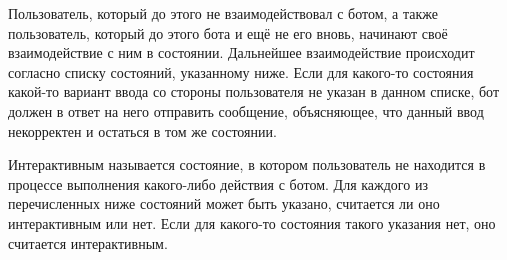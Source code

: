     Пользователь, который до этого не взаимодействовал с ботом, а также пользователь, который
    до этого  бота и ещё не  его вновь, начинают
    своё взаимодействие с ним в \hyperref[itm:req:ui:states:init]{} состоянии.
    Дальнейшее взаимодействие происходит согласно списку состояний, указанному ниже.
    Если для какого-то состояния какой-то вариант ввода со стороны пользователя не указан в данном
    списке, бот должен в ответ на него отправить сообщение, объясняющее, что данный
    ввод некорректен и остаться в том же состоянии.

    Интерактивным называется состояние, в котором пользователь не находится в процессе выполнения
    какого-либо действия с ботом. Для каждого из перечисленных ниже состояний может быть указано,
    считается ли оно интерактивным или нет. Если для какого-то состояния такого указания нет,
    оно считается интерактивным.


